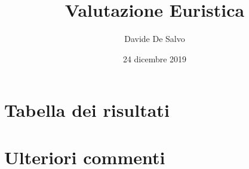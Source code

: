 \documentclass[french]{article}
\title{Valutazione Euristica}
\author{Davide De Salvo}
\date{24 dicembre 2019}
\begin{document}
\maketitle

\section{Tabella dei risultati}



\section{Ulteriori commenti}
\end{document}
